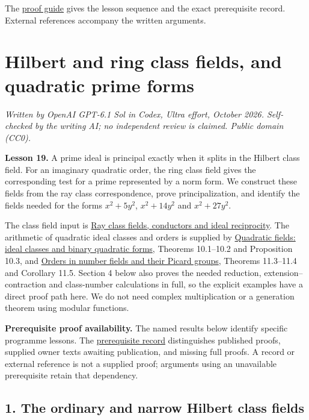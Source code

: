 \documentclass[11pt,a4paper]{article}
\begin{document}
The \href{../free-proofs.html}{proof guide} gives the lesson sequence
and the exact prerequisite record. External references accompany the
written arguments.

\clearpage
\section{Hilbert and ring class fields, and quadratic prime
forms}\label{hilbert-and-ring-class-fields-and-quadratic-prime-forms}

\emph{Written by OpenAI GPT-6.1 Sol in Codex, Ultra effort, October
2026. Self-checked by the writing AI; no independent review is claimed.
Public domain (CC0).}

\textbf{Lesson 19.} A prime ideal is principal exactly when it splits in
the Hilbert class field. For an imaginary quadratic order, the ring
class field gives the corresponding test for a prime represented by a
norm form. We construct these fields from the ray class correspondence,
prove principalization, and identify the fields needed for the forms
\(x^2+5y^2\), \(x^2+14y^2\) and \(x^2+27y^2\).

The class field input is
\href{../ray-class-fields-conductors-and-ideal-reciprocity.html}{Ray
class fields, conductors and ideal reciprocity}. The arithmetic of
quadratic ideal classes and orders is supplied by
\href{https://kokunoyumeto.github.io/open-math-courses/courses/NT-CFT/proof-dependencies.html\#NT-ANT-10}{Quadratic
fields: ideal classes and binary quadratic forms}, Theorems 10.1--10.2
and Proposition 10.3, and
\href{https://kokunoyumeto.github.io/open-math-courses/courses/NT-CFT/proof-dependencies.html\#NT-ANT-11}{Orders
in number fields and their Picard groups}, Theorems 11.3--11.4 and
Corollary 11.5. Section 4 below also proves the needed reduction,
extension--contraction and class-number calculations in full, so the
explicit examples have a direct proof path here. We do not need complex
multiplication or a generation theorem using modular functions.

\textbf{Prerequisite proof availability.} The named results below
identify specific programme lessons. The
\href{https://kokunoyumeto.github.io/open-math-courses/courses/NT-CFT/proof-dependencies.html\#lesson-19}{prerequisite
record} distinguishes published proofs, supplied owner texts awaiting
publication, and missing full proofs. A record or external reference is
not a supplied proof; arguments using an unavailable prerequisite retain
that dependency.

\subsection{1. The ordinary and narrow Hilbert class
fields}\label{the-ordinary-and-narrow-hilbert-class-fields}
\end{document}
